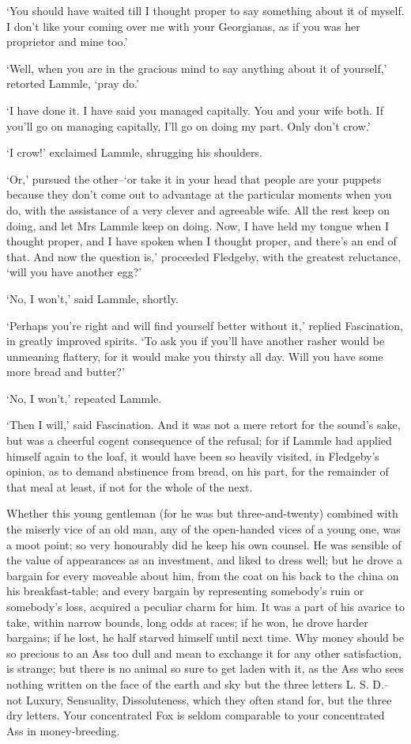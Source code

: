 ‘You should have waited till I thought proper to say something about it
of myself. I don’t like your coming over me with your Georgianas, as if
you was her proprietor and mine too.’

‘Well, when you are in the gracious mind to say anything about it of
yourself,’ retorted Lammle, ‘pray do.’

‘I have done it. I have said you managed capitally. You and your wife
both. If you’ll go on managing capitally, I’ll go on doing my part. Only
don’t crow.’

‘I crow!’ exclaimed Lammle, shrugging his shoulders.

‘Or,’ pursued the other--‘or take it in your head that people are your
puppets because they don’t come out to advantage at the particular
moments when you do, with the assistance of a very clever and agreeable
wife. All the rest keep on doing, and let Mrs Lammle keep on doing. Now,
I have held my tongue when I thought proper, and I have spoken when I
thought proper, and there’s an end of that. And now the question is,’
proceeded Fledgeby, with the greatest reluctance, ‘will you have another
egg?’

‘No, I won’t,’ said Lammle, shortly.

‘Perhaps you’re right and will find yourself better without it,’ replied
Fascination, in greatly improved spirits. ‘To ask you if you’ll have
another rasher would be unmeaning flattery, for it would make you
thirsty all day. Will you have some more bread and butter?’

‘No, I won’t,’ repeated Lammle.

‘Then I will,’ said Fascination. And it was not a mere retort for the
sound’s sake, but was a cheerful cogent consequence of the refusal; for
if Lammle had applied himself again to the loaf, it would have been so
heavily visited, in Fledgeby’s opinion, as to demand abstinence from
bread, on his part, for the remainder of that meal at least, if not for
the whole of the next.

Whether this young gentleman (for he was but three-and-twenty) combined
with the miserly vice of an old man, any of the open-handed vices of
a young one, was a moot point; so very honourably did he keep his own
counsel. He was sensible of the value of appearances as an investment,
and liked to dress well; but he drove a bargain for every moveable about
him, from the coat on his back to the china on his breakfast-table;
and every bargain by representing somebody’s ruin or somebody’s loss,
acquired a peculiar charm for him. It was a part of his avarice to take,
within narrow bounds, long odds at races; if he won, he drove harder
bargains; if he lost, he half starved himself until next time. Why money
should be so precious to an Ass too dull and mean to exchange it for any
other satisfaction, is strange; but there is no animal so sure to get
laden with it, as the Ass who sees nothing written on the face of the
earth and sky but the three letters L. S. D.--not Luxury, Sensuality,
Dissoluteness, which they often stand for, but the three dry letters.
Your concentrated Fox is seldom comparable to your concentrated Ass in
money-breeding.

